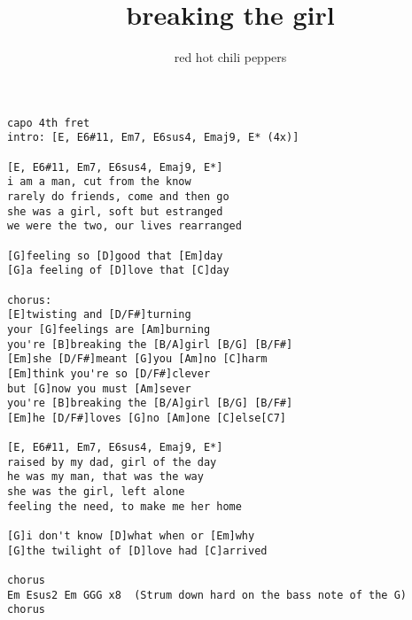 \author{red hot chili peppers}
\title{breaking the girl}
\maketitle
\begin{verbatim}
capo 4th fret
intro: [E, E6#11, Em7, E6sus4, Emaj9, E* (4x)]

[E, E6#11, Em7, E6sus4, Emaj9, E*]
i am a man, cut from the know
rarely do friends, come and then go
she was a girl, soft but estranged
we were the two, our lives rearranged

[G]feeling so [D]good that [Em]day
[G]a feeling of [D]love that [C]day

chorus:
[E]twisting and [D/F#]turning
your [G]feelings are [Am]burning
you're [B]breaking the [B/A]girl [B/G] [B/F#]
[Em]she [D/F#]meant [G]you [Am]no [C]harm
[Em]think you're so [D/F#]clever
but [G]now you must [Am]sever
you're [B]breaking the [B/A]girl [B/G] [B/F#]
[Em]he [D/F#]loves [G]no [Am]one [C]else[C7]

[E, E6#11, Em7, E6sus4, Emaj9, E*]
raised by my dad, girl of the day
he was my man, that was the way
she was the girl, left alone
feeling the need, to make me her home

[G]i don't know [D]what when or [Em]why
[G]the twilight of [D]love had [C]arrived

chorus
Em Esus2 Em GGG x8  (Strum down hard on the bass note of the G)
chorus
\end{verbatim}